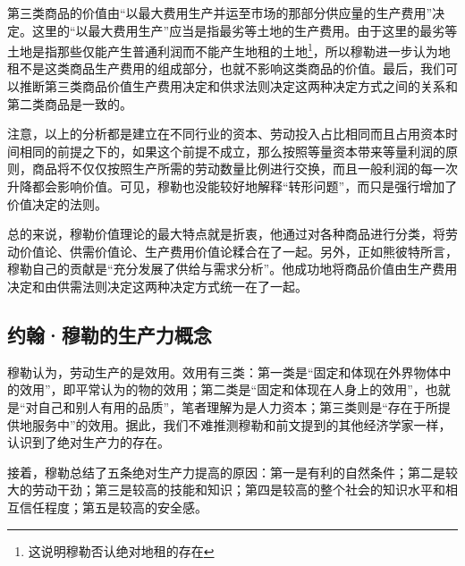 第三类商品的价值由“以最大费用生产并运至市场的那部分供应量的生产费用”\cite[535]{YueHan*MuLeZhengZhiJingJiXueYuanLiJiQiZaiSheHuiZheXueShangDeRuoGanYingYongShangJuan1991}决定。这里的“以最大费用生产”应当是指最劣等土地的生产费用。由于这里的最劣等土地是指那些仅能产生普通利润而不能产生地租的土地\footnote{这说明穆勒否认绝对地租的存在\cite[176]{YanZhiJieXiFangJingJiXueShuoShiJiaoChengDiErBan2013}}，所以穆勒进一步认为地租不是这类商品生产费用的组成部分，也就不影响这类商品的价值\cite[596]{YueHan*MuLeZhengZhiJingJiXueYuanLiJiQiZaiSheHuiZheXueShangDeRuoGanYingYongShangJuan1991}。最后，我们可以推断第三类商品价值生产费用决定和供求法则决定这两种决定方式之间的关系和第二类商品是一致的。

注意，以上的分析都是建立在不同行业的资本、劳动投入占比相同而且占用资本时间相同的前提之下的，如果这个前提不成立，那么按照等量资本带来等量利润的原则，商品将不仅仅按照生产所需的劳动数量比例进行交换，而且一般利润的每一次升降都会影响价值\cite[526-527]{YueHan*MuLeZhengZhiJingJiXueYuanLiJiQiZaiSheHuiZheXueShangDeRuoGanYingYongShangJuan1991}。可见，穆勒也没能较好地解释“转形问题”，而只是强行增加了价值决定的法则。

总的来说，穆勒价值理论的最大特点就是折衷，他通过对各种商品进行分类，将劳动价值论、供需价值论、生产费用价值论糅合在了一起。另外，正如熊彼特所言，穆勒自己的贡献是“充分发展了供给与需求分析”\cite[359]{YueSeFu*XiongBiTeJingJiFenXiShiDi2Juan2017}。他成功地将商品价值由生产费用决定和由供需法则决定这两种决定方式统一在了一起。

 \subsection{约翰·穆勒的生产力概念}

穆勒认为，劳动生产的是效用\cite[60]{YueHan*MuLeZhengZhiJingJiXueYuanLiJiQiZaiSheHuiZheXueShangDeRuoGanYingYongShangJuan1991}。效用有三类：第一类是“固定和体现在外界物体中的效用”\cite[62]{YueHan*MuLeZhengZhiJingJiXueYuanLiJiQiZaiSheHuiZheXueShangDeRuoGanYingYongShangJuan1991}，即平常认为的物的效用；第二类是“固定和体现在人身上的效用”，也就是“对自己和别人有用的品质”\cite[62]{YueHan*MuLeZhengZhiJingJiXueYuanLiJiQiZaiSheHuiZheXueShangDeRuoGanYingYongShangJuan1991}，笔者理解为是人力资本；第三类则是“存在于所提供地服务中”的效用\cite[62]{YueHan*MuLeZhengZhiJingJiXueYuanLiJiQiZaiSheHuiZheXueShangDeRuoGanYingYongShangJuan1991}。据此，我们不难推测穆勒和前文提到的其他经济学家一样，认识到了绝对生产力的存在。

接着，穆勒总结了五条绝对生产力提高的原因：第一是有利的自然条件；第二是较大的劳动干劲；第三是较高的技能和知识；第四是较高的整个社会的知识水平和相互信任程度；第五是较高的安全感。\cite[123-135]{YueHan*MuLeZhengZhiJingJiXueYuanLiJiQiZaiSheHuiZheXueShangDeRuoGanYingYongShangJuan1991}

